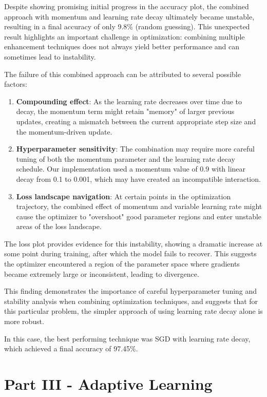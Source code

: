 \documentclass{article}
\begin{document}
\noindent Despite showing promising initial progress in the accuracy plot, the 
combined approach with momentum and learning rate decay ultimately became unstable,
resulting in a final accuracy of only 9.8\% (random guessing). 
This unexpected result highlights an important challenge in optimization: combining multiple enhancement techniques does not always yield better performance and can sometimes lead to instability.

The failure of this combined approach can be attributed to several possible factors:

\begin{enumerate}
    \item \textbf{Compounding effect}: As the learning rate decreases over time due to decay, the momentum term might retain "memory" of larger previous updates, creating a mismatch between the current appropriate step size and the momentum-driven update.
    
    \item \textbf{Hyperparameter sensitivity}: The combination may require more careful tuning of both the momentum parameter and the learning rate decay schedule. Our implementation used a momentum value of 0.9 with linear decay from 0.1 to 0.001, which may have created an incompatible interaction.
    
    \item \textbf{Loss landscape navigation}: At certain points in the optimization trajectory, the combined effect of momentum and variable learning rate might cause the optimizer to "overshoot" good parameter regions and enter unstable areas of the loss landscape.
\end{enumerate}

The loss plot provides evidence for this instability, showing a dramatic increase at some point during training, after which the model fails to recover. This suggests the optimizer encountered a region of the parameter space where gradients became extremely large or inconsistent, leading to divergence.

This finding demonstrates the importance of careful hyperparameter tuning and stability analysis when combining optimization techniques, and suggests that for this particular problem, the simpler approach of using learning rate decay alone is more robust.

In this case, the best performing technique was SGD with learning rate decay, which achieved a final accuracy of 97.45\%.

\section{Part III - Adaptive Learning}
\end{document}
